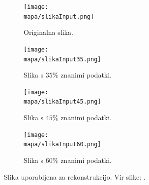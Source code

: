 \renewcommand{\mapa}{Poglavja/Slike/grayscale1000}

\begin{figure}[!ht]
    \centering
    \begin{subfigure}{0.49\linewidth}
        \texttt{[image: \\mapa/slikaInput.png]}
        \caption{Originalna slika.}
    \end{subfigure}
    \hfill
    \begin{subfigure}{0.49\linewidth}
        \texttt{[image: \\mapa/slikaInput35.png]}
        \caption{Slika s $35\%$ znanimi podatki.}
    \end{subfigure}
    \begin{subfigure}{0.49\linewidth}
        \texttt{[image: \\mapa/slikaInput45.png]}
        \caption{Slika s $45\%$ znanimi podatki.}
    \end{subfigure}
    \hfill
    \begin{subfigure}{0.49\linewidth}
        \texttt{[image: \\mapa/slikaInput60.png]}
        \caption{Slika s $60\%$ znanimi podatki.}
    \end{subfigure}
    \caption{Slika uporabljena za rekonstrukcijo. Vir slike: \cite{UnsplashGora}.}
\end{figure}

